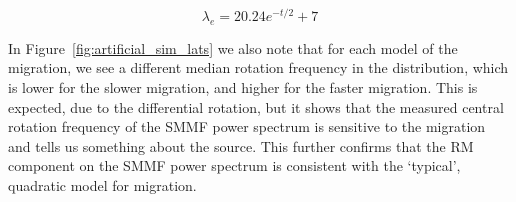 \begin{equation}
\lambda_{e} = 20.24 e^{-t/2} + 7
\label{eq:exp_lats}
\end{equation}

In Figure~\ref{fig:artificial_sim_lats} we also note that for each model of the migration, we see a different median rotation frequency in the distribution, which is lower for the slower migration, and higher for the faster migration. This is expected, due to the differential rotation, but it shows that the measured central rotation frequency of the SMMF power spectrum is sensitive to the migration and tells us something about the source. This further confirms that the RM component on the SMMF power spectrum is consistent with the `typical', quadratic model for migration.

\begin{figure}[!ht]
	\centering
	\qquad
	 \\
	
	\qquad
	

\end{figure}
